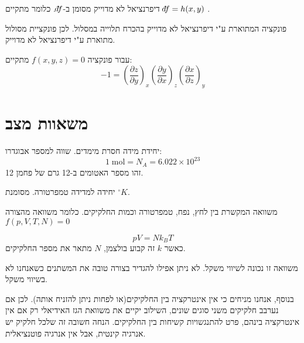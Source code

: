 \documentclass{tstextbook}
\begin{document}
\begin{symbolize}
דיפרנציאל לא מדוייק מסומן ב-\(\;\bar{}\mkern-7.5mu df\). כלומר מתקיים \(\;\bar{}\mkern-7.5mu df=h(x,y)\) .

\end{symbolize}
\begin{corollary}
פונקציה המתוארת ע"י דיפרנציאל לא מדוייק בהכרח תלוייה במסלול. לכן פונקציית מסולול מתוארת ע"י דיפרנציאל לא מדוייק.

\end{corollary}
\begin{proposition}
עבור פונקציה \(f(x,y,z)=0\) מתקיים:
$$-1=\left({\frac{\partial z}{\partial y}}\right)_{x}\left({\frac{\partial y}{\partial x}}\right)_{z}\left({\frac{\partial x}{\partial z}}\right)_{y}$$

\end{proposition}
\section{משאוות מצב}

\begin{definition}[מול]
יחידת מידה חסרת מימדים. שווה למספר אבוגדרו:
$$1\;{\mathrm{mol}}=N_{A}=6.022\times10^{23}$$
זהו מספר האטומים ב-12 גרם של פחמן 12.

\end{definition}
\begin{definition}[קלווין]
יחידה למדידה טמפרטורה. מסומנת \(^\circ K\).

\end{definition}
\begin{definition}
משוואה המקשרת בין לחץ, נפח, טמפרטורה וכמות החלקיקים. כלומר משוואה מהצורה \(f\left(p,V,T,N \right)=0\)

\end{definition}
\begin{theorem}
$$pV = Nk_{B}T$$
כאשר \(k\) זה קבוע בולצמן, \(N\) מתאר את מספר החלקיקים.

\end{theorem}
\begin{remark}
משוואה זו נכונה לשיווי משקל. לא ניתן אפילו להגדיר בצורה טובה את המשתנים כשאנחנו לא בשיווי משקל.

\end{remark}
בנוסף, אנחנו מניחים כי אין אינטרקציה בין החלקיקים(או לפחות ניתן להזניח אותה). לכן אם נערבב חלקיקים משני סוגים שונים, השילוב יקיים את משוואת הגז האידיאלי רק אם אין אינטרקציה בינהם, פרט להתנגשויות קשיחות בין החלקיקים. הנחה חשובה זה שלכל חלקיק יש אנרגיה קינטית, אבל אין אנרגיה פוטנציאלית.
\end{document}
